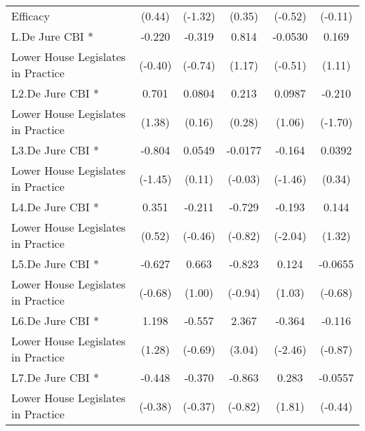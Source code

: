 {\begin{tabular}{l*{5}{c}}
Efficacy            &      (0.44)         &     (-1.32)         &      (0.35)         &     (-0.52)         &     (-0.11)         \\
[1em]
L.De Jure CBI *     &      -0.220         &      -0.319         &       0.814         &     -0.0530         &       0.169         \\
Lower House Legislates in Practice&     (-0.40)         &     (-0.74)         &      (1.17)         &     (-0.51)         &      (1.11)         \\
[1em]
L2.De Jure CBI *    &       0.701         &      0.0804         &       0.213         &      0.0987         &      -0.210         \\
Lower House Legislates in Practice&      (1.38)         &      (0.16)         &      (0.28)         &      (1.06)         &     (-1.70)         \\
[1em]
L3.De Jure CBI *    &      -0.804         &      0.0549         &     -0.0177         &      -0.164         &      0.0392         \\
Lower House Legislates in Practice&     (-1.45)         &      (0.11)         &     (-0.03)         &     (-1.46)         &      (0.34)         \\
[1em]
L4.De Jure CBI *    &       0.351         &      -0.211         &      -0.729         &      -0.193\sym{*}  &       0.144         \\
Lower House Legislates in Practice&      (0.52)         &     (-0.46)         &     (-0.82)         &     (-2.04)         &      (1.32)         \\
[1em]
L5.De Jure CBI *    &      -0.627         &       0.663         &      -0.823         &       0.124         &     -0.0655         \\
Lower House Legislates in Practice&     (-0.68)         &      (1.00)         &     (-0.94)         &      (1.03)         &     (-0.68)         \\
[1em]
L6.De Jure CBI *    &       1.198         &      -0.557         &       2.367\sym{**} &      -0.364\sym{*}  &      -0.116         \\
Lower House Legislates in Practice&      (1.28)         &     (-0.69)         &      (3.04)         &     (-2.46)         &     (-0.87)         \\
[1em]
L7.De Jure CBI *    &      -0.448         &      -0.370         &      -0.863         &       0.283         &     -0.0557         \\
Lower House Legislates in Practice&     (-0.38)         &     (-0.37)         &     (-0.82)         &      (1.81)         &     (-0.44)         \\

\end{tabular}}
